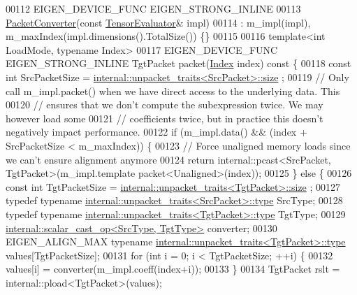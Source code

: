 \begin{DoxyCode}
00112   EIGEN\_DEVICE\_FUNC EIGEN\_STRONG\_INLINE
00113   \hyperlink{struct_eigen_1_1_packet_converter}{PacketConverter}(\textcolor{keyword}{const} \hyperlink{struct_eigen_1_1_tensor_evaluator}{TensorEvaluator}& impl)
00114       : m\_impl(impl), m\_maxIndex(impl.dimensions().TotalSize()) \{\}
00115 
00116   \textcolor{keyword}{template}<\textcolor{keywordtype}{int} LoadMode, \textcolor{keyword}{typename} Index>
00117   EIGEN\_DEVICE\_FUNC EIGEN\_STRONG\_INLINE TgtPacket packet(\hyperlink{namespace_eigen_a62e77e0933482dafde8fe197d9a2cfde}{Index} index)\textcolor{keyword}{ const }\{
00118     \textcolor{keyword}{const} \textcolor{keywordtype}{int} SrcPacketSize = \hyperlink{struct_eigen_1_1internal_1_1unpacket__traits}{internal::unpacket\_traits<SrcPacket>::size}
      ;
00119     \textcolor{comment}{// Only call m\_impl.packet() when we have direct access to the underlying data. This}
00120     \textcolor{comment}{// ensures that we don't compute the subexpression twice. We may however load some}
00121     \textcolor{comment}{// coefficients twice, but in practice this doesn't negatively impact performance.}
00122     \textcolor{keywordflow}{if} (m\_impl.data() && (index + SrcPacketSize < m\_maxIndex)) \{
00123       \textcolor{comment}{// Force unaligned memory loads since we can't ensure alignment anymore}
00124       \textcolor{keywordflow}{return} internal::pcast<SrcPacket, TgtPacket>(m\_impl.template packet<Unaligned>(index));
00125     \} \textcolor{keywordflow}{else} \{
00126       \textcolor{keyword}{const} \textcolor{keywordtype}{int} TgtPacketSize = \hyperlink{struct_eigen_1_1internal_1_1unpacket__traits}{internal::unpacket\_traits<TgtPacket>::size}
      ;
00127       \textcolor{keyword}{typedef} \textcolor{keyword}{typename} \hyperlink{union_eigen_1_1internal_1_1_packet}{internal::unpacket\_traits<SrcPacket>::type}
       SrcType;
00128       \textcolor{keyword}{typedef} \textcolor{keyword}{typename} \hyperlink{union_eigen_1_1internal_1_1_packet}{internal::unpacket\_traits<TgtPacket>::type}
       TgtType;
00129       \hyperlink{struct_eigen_1_1internal_1_1scalar__cast__op}{internal::scalar\_cast\_op<SrcType, TgtType>} converter;
00130       EIGEN\_ALIGN\_MAX \textcolor{keyword}{typename} \hyperlink{union_eigen_1_1internal_1_1_packet}{internal::unpacket\_traits<TgtPacket>::type}
       values[TgtPacketSize];
00131       \textcolor{keywordflow}{for} (\textcolor{keywordtype}{int} i = 0; i < TgtPacketSize; ++i) \{
00132         values[i] = converter(m\_impl.coeff(index+i));
00133       \}
00134       TgtPacket rslt = internal::pload<TgtPacket>(values);

\end{DoxyCode}
